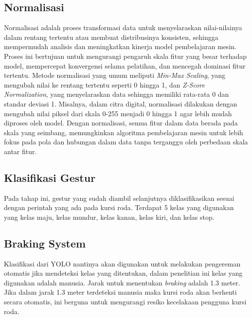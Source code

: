\subsection{Normalisasi}
Normalisasi adalah proses transformasi data untuk menyelaraskan nilai-nilainya dalam rentang tertentu atau membuat distribusinya konsisten, sehingga mempermudah analisis dan meningkatkan kinerja model pembelajaran mesin. Proses ini bertujuan untuk mengurangi pengaruh skala fitur yang besar terhadap model, mempercepat konvergensi selama pelatihan, dan mencegah dominasi fitur tertentu. Metode normalisasi yang umum meliputi \emph{Min-Max Scaling}, yang mengubah nilai ke rentang tertentu seperti 0 hingga 1, dan \emph{Z-Score Normalization}, yang menyelaraskan data sehingga memiliki rata-rata 0 dan standar deviasi 1. Misalnya, dalam citra digital, normalisasi dilakukan dengan mengubah nilai piksel dari skala 0-255 menjadi 0 hingga 1 agar lebih mudah diproses oleh model. Dengan normalisasi, semua fitur dalam data berada pada skala yang seimbang, memungkinkan algoritma pembelajaran mesin untuk lebih fokus pada pola dan hubungan dalam data tanpa terganggu oleh perbedaan skala antar fitur.

\subsection{Klasifikasi Gestur}
Pada tahap ini, gestur yang sudah diambil selanjutnya diklasifikasikan sesuai dengan perintah yang ada pada kursi roda. Terdapat 5 kelas yang digunakan yang kelas maju, kelas mundur, kelas kanan, kelas kiri, dan kelas stop.

\subsection{Braking System}
Klasifikasi dari YOLO nantinya akan digunakan untuk melakukan pengereman otomatis jika mendeteksi kelas yang ditentukan, dalam penelitian ini kelas yang digunakan adalah manusia. Jarak untuk menentukan \emph{braking} adalah 1.3 meter. Jika dalam jarak 1.3 meter terdeteksi manusia maka kursi roda akan berhenti secara otomatis, ini berguna untuk mengurangi resiko kecelakaan pengguna kursi roda.
